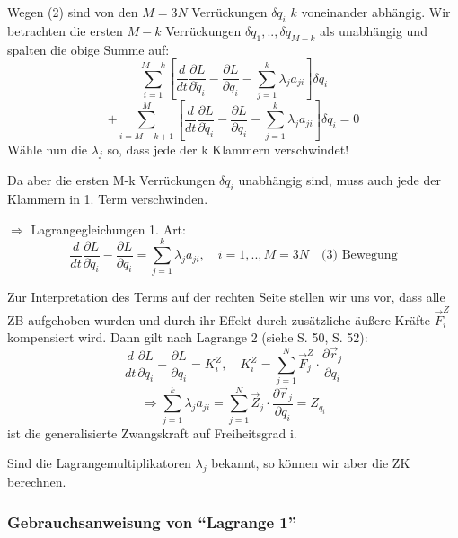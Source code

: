 \documentclass[10pt, letterpaper]{article}
\begin{document}
Wegen (2) sind von den $M=3N$ Verrückungen $\delta q_i$ $k$ voneinander abhängig. Wir betrachten die ersten $M-k$ Verrückungen $\delta q_1,..,\delta q_{M-k}$ als unabhängig und spalten die obige Summe auf:
\[\sum_{i=1}^{M-k} \left[\frac{d}{dt}\frac{\partial L}{\partial \dot{q}_i} - \frac{\partial L}{\partial q_i} - \sum_{j=1}^k \lambda_j a_{ji}\right]\delta q_i\]
\[+ \sum_{i=M-k+1}^M \left[\frac{d}{dt}\frac{\partial L}{\partial \dot{q}_i} - \frac{\partial L}{\partial q_i} - \sum_{j=1}^k \lambda_j a_{ji}\right]\delta q_i = 0\]
Wähle nun die $\lambda_j$ so, dass jede der k Klammern verschwindet!

Da aber die ersten M-k Verrückungen $\delta q_i$ unabhängig sind, muss auch jede der Klammern in 1. Term verschwinden.

$\Rightarrow$ Lagrangegleichungen 1. Art:
\[\frac{d}{dt}\frac{\partial L}{\partial \dot{q}_i} - \frac{\partial L}{\partial q_i} = \sum_{j=1}^k \lambda_j a_{ji}, \quad i=1,..,M=3N \quad \text{(3) Bewegung}\]



Zur Interpretation des Terms auf der rechten Seite stellen wir uns vor, dass alle ZB aufgehoben wurden und durch ihr Effekt durch zusätzliche äußere Kräfte $\vec{F}_i^Z$ kompensiert wird. Dann gilt nach Lagrange 2 (siehe S. 50, S. 52):
\[\frac{d}{dt}\frac{\partial L}{\partial \dot{q}_i} - \frac{\partial L}{\partial q_i} = K_i^Z, \quad K_i^Z = \sum_{j=1}^N \vec{F}_j^Z \cdot \frac{\partial \vec{r}_j}{\partial q_i}\]
\[\Rightarrow \sum_{j=1}^k \lambda_j a_{ji} = \sum_{j=1}^N \vec{Z}_j \cdot \frac{\partial \vec{r}_j}{\partial q_i} = Z_{q_i}\]
ist die generalisierte Zwangskraft auf Freiheitsgrad i.

Sind die Lagrangemultiplikatoren $\lambda_j$ bekannt, so können wir aber die ZK berechnen.




\subsubsection{Gebrauchsanweisung von ``Lagrange 1''}
\end{document}
